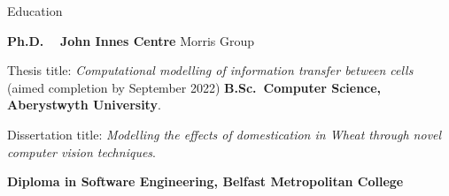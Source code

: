 \begin{rubric}{Education}

\entry*[2018 -- 2022]%
	\textbf{Ph.D. ~ John Innes Centre} Morris Group
	\par Thesis title: \emph{Computational modelling of information transfer
	between cells} (aimed completion by September 2022)
%
\entry*[2014 -- 2018]%
	\textbf{B.Sc.~Computer Science, Aberystwyth University}.\par
	Dissertation title: \emph{Modelling the effects of domestication in Wheat
	through novel computer vision techniques}.

\entry*[2012 -- 2014]%
	\textbf{Diploma in Software Engineering, Belfast Metropolitan College}

\end{rubric}